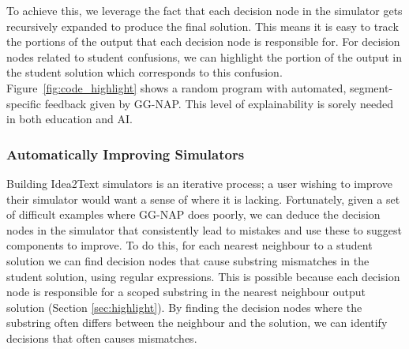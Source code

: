 To achieve this, we leverage the fact that each decision node in the simulator gets recursively expanded to produce the final solution. This means it is easy to track the portions of the output that each decision node is responsible for. For decision nodes related to student confusions, we can highlight the portion of the output in the student solution which corresponds to this confusion.
Figure~\ref{fig:code_highlight} shows a random program with automated, segment-specific feedback given by GG-NAP. This level of explainability is sorely needed in both education and AI.


\subsubsection{Automatically Improving Simulators}
\label{subsec:autoimprove}
Building Idea2Text simulators is an iterative process; a user wishing to improve their simulator would want a sense of where it is lacking. Fortunately, given a set of difficult examples where GG-NAP does poorly, we can deduce the decision nodes in the simulator that consistently lead to mistakes and use these to suggest components to improve. 
To do this, for each nearest neighbour to a student solution we can find decision nodes that cause substring mismatches in the student solution, using regular expressions. This is possible because each decision node is responsible for a scoped substring in the nearest neighbour output solution (Section \ref{sec:highlight}). By finding the decision nodes where the substring often differs between the neighbour and the solution, we can identify decisions that often causes mismatches.

